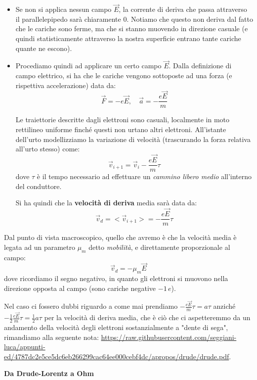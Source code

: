 \documentclass[a4paper,11pt]{article}
\begin{document}
\begin{itemize}
	\item 
Se non si applica nessun campo $\vec{E}$, la corrente di deriva che passa attraverso il parallelepipedo sarà chiaramente 0. Notiamo che questo non deriva dal fatto che le cariche sono ferme, ma che si stanno muovendo in direzione casuale (e quindi statisticamente attraverso la nostra superficie entrano tante cariche quante ne escono).
	\item
Procediamo quindi ad applicare un certo campo $\vec{E}$.
Dalla definizione di campo elettrico, si ha che le cariche vengono sottoposte ad una forza (e rispettiva accelerazione) data da:
$$
\vec{F} = - e \vec{E}, \quad \vec{a} = - \frac{e \vec{E}}{m}
$$

Le traiettorie descritte dagli elettroni sono casuali, localmente in moto rettilineo uniforme finché questi non urtano altri elettroni. All'istante dell'urto modellizziamo la variazione di velocità (trascurando la forza relativa all'urto stesso) come:
$$
\vec{v}_{i + 1} = \vec{v}_i - \frac{e \vec{E}}{m} \tau
$$
dove $\tau$ è il tempo necessario ad effettuare un \textit{cammino libero medio} all'interno del conduttore.

Si ha quindi che la \textbf{velocità di deriva} media sarà data da:
$$
\vec{v}_d = < \vec{v}_{i + 1} > = - \frac{e \vec{E}}{m} \tau
$$
\end{itemize}

Dal punto di vista macroscopico, quello che avremo è che la velocità media è legata ad un parametro $\mu_m$ detto \textit{mobilità}, e direttamente proporzionale al campo:
$$
\vec{v}_d = -\mu_m \vec{E}
$$
dove ricordiamo il segno negativo, in quanto gli elettroni si muovono nella direzione opposta al campo (sono cariche negative $-1 \, e$).

\par\smallskip

Nel caso ci fossero dubbi riguardo a come mai prendiamo $ - \frac{e \vec{E}}{m} \tau = a \tau$ anziché $ - \frac{1}{2} \frac{e \vec{E}}{m} \tau = \frac{1}{2} a \tau$ per la velocità di deriva media, che è ciò che ci aspetteremmo da un andamento della velocità degli elettroni sostanzialmente a "dente di sega", rimandiamo alla seguente nota: \url{https://raw.githubusercontent.com/seggiani-luca/appunti-ed/4787dc2e5ce5dc6eb266299cac64ee000cebf4dc/apropos/drude/drude.pdf}.

\par\smallskip

\noindent
\textbf{\textsf{Da Drude-Lorentz a Ohm}}
\end{document}
